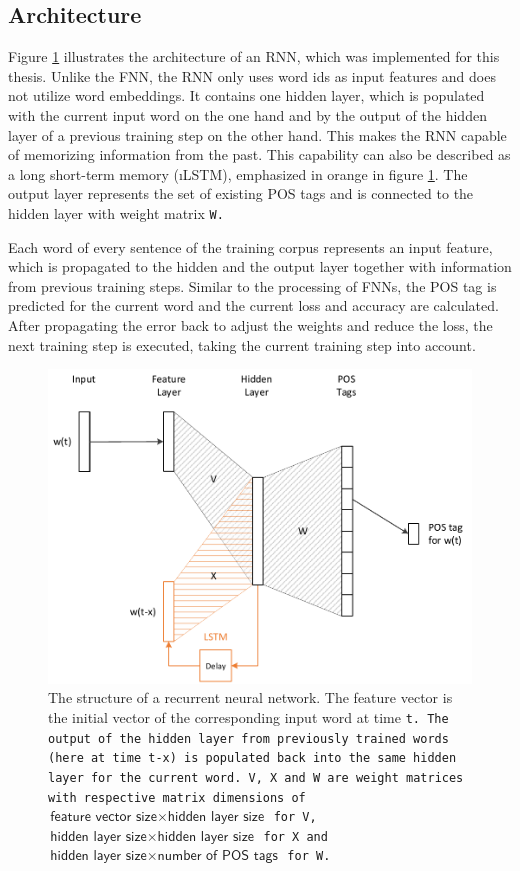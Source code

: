 \subsection{Architecture}\label{c.postagging.rnn.architecture}
Figure \ref{f.rnn.structure} illustrates the architecture of an RNN, which was implemented for this thesis. Unlike the FNN, the RNN only uses word ids as input features and does not utilize word embeddings. It contains one hidden layer, which is populated with the current input word on the one hand and by the output of the hidden layer of a previous training step on the other hand. This makes the RNN capable of memorizing information from the past. This capability can also be described as a long short-term memory (\i{LSTM}), emphasized in orange in figure \ref{f.rnn.structure}. The output layer represents the set of existing POS tags and is connected to the hidden layer with weight matrix
\tt{W}.

Each word of every sentence of the training corpus represents an input feature, which is propagated to the hidden and the output layer together with information from previous training steps. Similar to the processing of FNNs, the POS tag is predicted for the current word and the current loss and accuracy are calculated. After propagating the error back to adjust the weights and reduce the loss, the next training step is executed, taking the current training step into account.

\begin{figure}[ht]
	\includegraphics[width=\textwidth]{images/rnn_structure}
	\caption[Structure of a Recurrent Neural Network]{The structure of a recurrent neural network. The feature vector is the initial vector of the corresponding input word at time \tt{t}. The output of the hidden layer from previously trained words (here at time \tt{t-x}) is populated back into the same hidden layer for the current word. \tt{V}, \tt{X} and \tt{W} are weight matrices with respective matrix dimensions of $\textsf{feature vector size} \times \textsf{hidden layer size}$ for \tt{V}, $\textsf{hidden layer size} \times \textsf{hidden layer size}$ for \tt{X} and $\textsf{hidden layer size} \times \textsf{number of POS tags}$ for \tt{W}.}
	\label{f.rnn.structure}
\end{figure}

